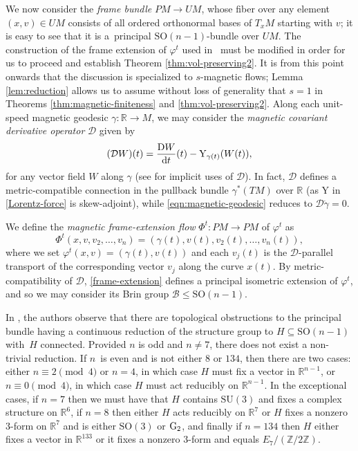 \documentclass[pdftex]{sigma}
\newcommand{\Y}{\mathrm{Y}}
\newcommand{\SO}{\text{SO}}
\newcommand{\R}{\mathbb{R}}
\numberwithin{equation}{section}
\theoremstyle{definition}
\begin{document}
We now consider the \emph{frame bundle} $PM\to UM$, whose fiber over any element $(x,v) \in UM$ consists of all ordered orthonormal bases of $T_xM$ starting with $v$; it is easy to see that it is a~principal $\SO(n-1)$-bundle over $UM$. The construction of the frame extension of $\varphi^t$ used in~\cite{filip2024finiteness} must be modified in order for us to proceed and establish Theorem \ref{thm:vol-preserving2}. It is from this point onwards that the discussion is specialized to $s$-magnetic flows; Lemma \ref{lem:reduction} allows us to assume without loss of generality that $s=1$ in Theorems \ref{thm:magnetic-finiteness} and \ref{thm:vol-preserving2}. Along each unit-speed magnetic geodesic $\gamma\colon \R\to M$, we may consider the \emph{magnetic covariant derivative operator} $\mathcal{D}$ given by
\begin{equation}\label{mag-covariant}
 (\mathcal{D}W)(t) = \frac{{\rm D}W}{{\rm d}t}(t) - \Y_{\gamma(t)}(W(t)),
\end{equation}for any vector field $W$ along $\gamma$ (see \cite{assenza-imrn,grognet-etds} for implicit uses of $\mathcal{D}$). In fact, $\mathcal{D}$ defines a metric-compatible connection in the pullback bundle $\gamma^*(TM)$ over $\R$ (as $\Y$ in \eqref{Lorentz-force} is skew-adjoint), while \eqref{eqn:magnetic-geodesic} reduces to $\mathcal{D}\dot{\gamma}=0$.

We define the \emph{magnetic frame-extension flow} $\Phi^t\colon PM\to PM$ of $\varphi^t$ as
 \begin{equation}\label{frame-extension}\Phi^t(x, v, v_2, \ldots, v_n) = (\gamma(t), v(t), v_2(t), \ldots, v_n(t)), \end{equation}
 where we set $\varphi^t(x,v) = (\gamma(t), v(t))$ and each $v_j(t)$ is the $\mathcal{D}$-parallel transport of the corresponding vector $v_j$ along the curve $x(t)$. By metric-compatibility of $\mathcal{D}$, \eqref{frame-extension} defines a principal isometric extension of $\varphi^t$, and so we may consider its Brin group $\mathcal{B} \leq \SO(n-1)$.

 In \cite[Remark 3.3.3]{filip2024finiteness}, the authors observe that there are topological obstructions to the principal bundle having a continuous reduction of the structure group to $H \subseteq\SO(n-1)$ with~$H$ connected. Provided $n$ is odd and $n \neq 7$, there does not exist a non-trivial reduction. If $n$~is even and is not either $8$ or $134$, then there are two cases: either $n \equiv 2 \pmod{4}$ or $n=4$, in which case $H$ must fix a vector in $\mathbb{R}^{n-1}$, or $n \equiv 0 \pmod{4}$, in which case $H$ must act reducibly on $\mathbb{R}^{n-1}$. In the exceptional cases, if $n = 7$ then we must have that $H$ contains $\text{SU}(3)$ and fixes a complex structure on $\mathbb{R}^6$, if $n=8$ then either $H$ acts reducibly on $\mathbb{R}^7$ or $H$ fixes a nonzero $3$-form on $\mathbb{R}^7$ and is either $\SO(3)$ or ${\rm G}_2$, and finally if $n =134$ then $H$ either fixes a vector in $\mathbb{R}^{133}$ or it fixes a nonzero $3$-form and equals $E_7/(\mathbb{Z}/2 \mathbb{Z})$.
\end{document}
